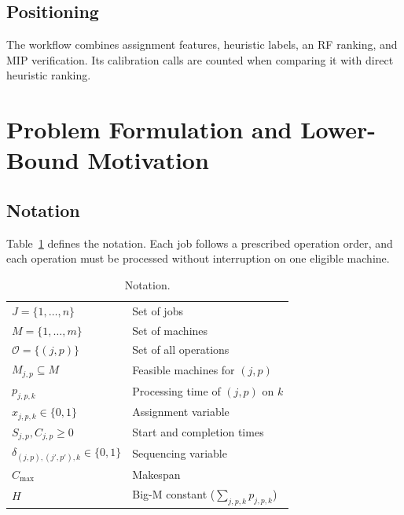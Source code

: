\documentclass[conference]{IEEEtran}
\begin{document}
\subsection{Positioning}
The workflow combines assignment features, heuristic labels, an RF ranking, and MIP verification. Its calibration calls are counted when comparing it with direct heuristic ranking.


\section{Problem Formulation and Lower-Bound Motivation}

\subsection{Notation}
Table~\ref{tab:notation} defines the notation. Each job follows a prescribed operation order, and each operation must be processed without interruption on one eligible machine.
\begin{table}[htbp]\centering\caption{Notation.}\label{tab:notation}
\begin{tabular}{ll}\toprule
$J=\{1,\ldots,n\}$ & Set of jobs \\
$M=\{1,\ldots,m\}$ & Set of machines \\
$\mathcal{O}=\{(j,p)\}$ & Set of all operations \\
$M_{j,p}\subseteq M$ & Feasible machines for $(j,p)$ \\
$p_{j,p,k}$ & Processing time of $(j,p)$ on $k$ \\
$x_{j,p,k}\in\{0,1\}$ & Assignment variable \\
$S_{j,p},C_{j,p}\geq 0$ & Start and completion times \\
$\delta_{(j,p),(j',p'),k}\in\{0,1\}$ & Sequencing variable \\
$C_{\max}$ & Makespan \\
$H$ & Big-M constant ($\sum_{j,p,k}p_{j,p,k}$) \\ \bottomrule
\end{tabular}
\end{table}
\end{document}
